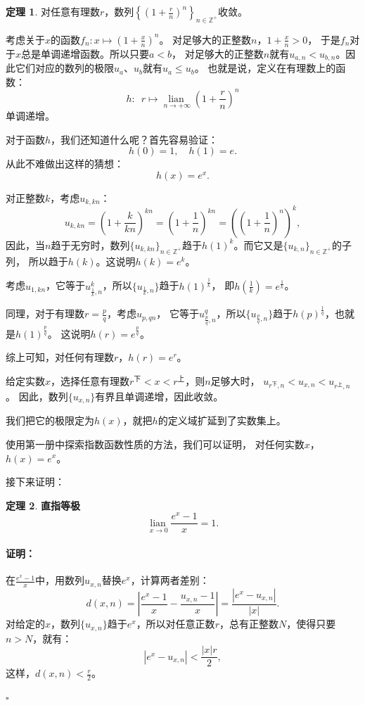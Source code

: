 \documentclass[12pt,UTF8]{ctexbook}
\newcommand{\lian}[1]{
    \underset{#1}{\operatorname{lian}\,}
}
\theoremstyle{definition}
\newtheorem{tm}{定理}[section]
\theoremstyle{plain}
\renewenvironment{proof}{\paragraph{\textbf{证明：}}}{\hfill$\square$}
\begin{document}
\begin{appendix}
\begin{tm}\label{tm:b-1-40}
    对任意有理数$r$，数列$\left\{\left(1 + \frac{r}{n}\right)^n\right\}_{n\in\mathbb{Z}^+}$收敛。
\end{tm}

考虑关于$x$的函数$f_{n} : x \mapsto \left(1 + \frac{x}{n}\right)^n $。
对足够大的正整数$n$，$1 + \frac{x}{n} > 0$， 于是$f_n$对于$x$总是单调递增函数。所以只要$a < b$，
对足够大的正整数$n$就有$u_{a,n} < u_{b,n}$。因此它们对应的数列的极限$u_a$、$u_b$就有$u_a \leqslant u_b$。
也就是说，定义在有理数上的函数：
$$ h: \,\,\, r \mapsto \lian{n\to +\infty}  \left(1 + \frac{r}{n}\right)^n $$
单调递增。

对于函数$h$，我们还知道什么呢？首先容易验证：
$$ h(0) = 1, \quad h(1) = e.$$ 
从此不难做出这样的猜想：
$$ h(x) = e^x. $$

对正整数$k$，考虑$u_{k,kn}$：
$$ u_{k,kn} = \left(1 + \frac{k}{kn}\right)^{kn} = \left(1 + \frac{1}{n}\right)^{kn} = \left(\left(1 + \frac{1}{n}\right)^{n}\right)^{k}, $$
因此，当$n$趋于无穷时，数列$\{u_{k,kn}\}_{n\in\mathbb{Z}^+}$趋于$h(1)^k$。而它又是$\{u_{k,n}\}_{n\in\mathbb{Z}^+}$的子列，
所以趋于$h(k)$。这说明$h(k) = e^k$。

考虑$u_{1,kn}$，它等于$u_{\frac{1}{k},n}^k$，所以$\{u_{\frac{1}{k},n}\}$趋于$h(1)^{\frac{1}{k}}$，
即$h(\frac{1}{k}) = e^{\frac{1}{k}}$。

同理，对于有理数$r = \frac{p}{q}$，考虑$u_{p,qn}$，
它等于$u_{\frac{p}{q},n}^q$，所以$\{u_{\frac{p}{q},n}\}$趋于$h(p)^{\frac{1}{q}}$，也就是$h(1)^{\frac{p}{q}}$。
这说明$h(r) = e^{\frac{p}{q}}$。

综上可知，对任何有理数$r$，$h(r) = e^r$。

给定实数$x$，选择任意有理数$r^{\text{下}} < x < r^{\text{上}}$，则$n$足够大时，
$u_{r^\text{下},n} < u_{x,n} < u_{r^\text{上},n}$。
因此，数列$\{u_{x,n}\}$有界且单调递增，因此收敛。

我们把它的极限定为$h(x)$，就把$h$的定义域扩延到了实数集上。

使用第一册中探索指数函数性质的方法，我们可以证明，
对任何实数$x$，$h(x) = e^x$。

接下来证明：
\begin{tm}{\textbf{直指等极}}\label{tm:b-1-50}
    $$\lian{x\to 0} \frac{e^x - 1}{x} = 1.$$
\end{tm}

\begin{proof}
    在$\frac{e^x - 1}{x}$中，用数列$u_{x,n}$替换$e^x$，计算两者差别：
    $$ d(x, n) = \left|\frac{e^x - 1}{x} - \frac{u_{x,n} - 1}{x}\right| = \frac{\left|e^x - u_{x,n}\right|}{\left|x\right|}. $$
    对给定的$x$，数列$\{u_{x,n}\}$趋于$e^x$，所以对任意正数$r$，总有正整数$N$，使得只要$n>N$，就有：
    $$ \left|e^x - u_{x,n}\right| < \frac{|x|r}{2},$$
    这样，$d(x, n) < \frac{r}{2}$。


\end{proof}
\end{appendix}
\end{document}
